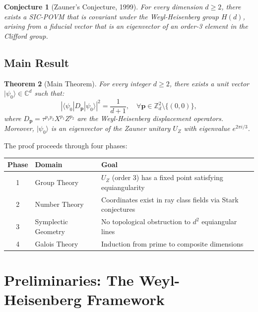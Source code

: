 \documentclass[a4paper,11pt]{article}
\newtheorem{theorem}{Theorem}[section]
\newtheorem{conjecture}[theorem]{Conjecture}
\newcommand{\C}{\mathbb{C}}
\newcommand{\Z}{\mathbb{Z}}
\begin{document}
\begin{conjecture}[Zauner's Conjecture, 1999]
For every dimension $d \geq 2$, there exists a SIC-POVM that is covariant under the Weyl-Heisenberg group $H(d)$, arising from a fiducial vector that is an eigenvector of an order-3 element in the Clifford group.
\end{conjecture}

\subsection{Main Result}

\begin{theorem}[Main Theorem]\label{thm:main}
For every integer $d \geq 2$, there exists a unit vector $|\psi_0\rangle \in \C^d$ such that:
\begin{equation}\label{eq:sic-condition}
|\langle\psi_0|D_\mathbf{p}|\psi_0\rangle|^2 = \frac{1}{d+1}, \quad \forall \mathbf{p} \in \Z_d^2 \setminus \{(0,0)\},
\end{equation}
where $D_\mathbf{p} = \tau^{p_1 p_2} X^{p_1} Z^{p_2}$ are the Weyl-Heisenberg displacement operators. Moreover, $|\psi_0\rangle$ is an eigenvector of the Zauner unitary $U_Z$ with eigenvalue $e^{2\pi i/3}$.
\end{theorem}

The proof proceeds through four phases:
\begin{center}
\begin{tabular}{|c|l|l|}
\hline
\textbf{Phase} & \textbf{Domain} & \textbf{Goal} \\
\hline
1 & Group Theory & $U_Z$ (order 3) has a fixed point satisfying equiangularity \\
2 & Number Theory & Coordinates exist in ray class fields via Stark conjectures \\
3 & Symplectic Geometry & No topological obstruction to $d^2$ equiangular lines \\
4 & Galois Theory & Induction from prime to composite dimensions \\
\hline
\end{tabular}
\end{center}

\section{Preliminaries: The Weyl-Heisenberg Framework}
\end{document}
